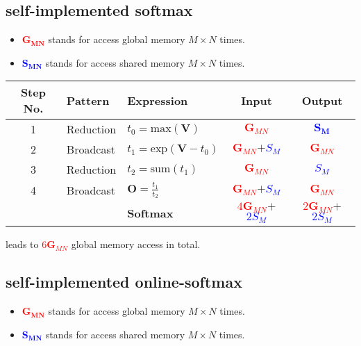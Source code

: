 \subsection{self-implemented softmax}

\begin{itemize}
    \item \textcolor{red}{$\mathbf{G_{MN}}$} stands for access global memory $M\times N$ times.
    \item \textcolor{blue}{$\mathbf{S_{MN}}$} stands for access shared memory $M\times N$ times.
\end{itemize}

\begin{tabular}{c|llcc}
    \toprule
    \textbf{Step No.}&\textbf{Pattern}&\textbf{Expression}&\textbf{Input}&\textbf{Output}\\\midrule
    1 & Reduction & $t_0 = \text{max}(\mathbf{V})$ &\textcolor{red}{$\mathbf{G}_{MN}$}&\textcolor{blue}{$\mathbf{S_M}$}\\
    2 & Broadcast & $t_1 = \text{exp}(\mathbf{V} - t_0)$&\textcolor{red}{$\mathbf{G}_{MN}$}$+$\textcolor{blue}{$S_M$}&\textcolor{red}{$\mathbf{G}_{MN}$}\\
    3 & Reduction & $t_2 = \text{sum}(t_1)$&\textcolor{red}{$\mathbf{G}_{MN}$}&\textcolor{blue}{$S_M$}\\
    4 & Broadcast & $\mathbf{O} = \frac{t_1}{t_2}$&\textcolor{red}{$\mathbf{G}_{MN}$}$+$\textcolor{blue}{$S_M$}&\textcolor{red}{$\mathbf{G}_{MN}$}\\\midrule
    &&\textbf{\textcolor{byzantium}{Softmax}}&\textcolor{red}{$4\mathbf{G}_{MN}$}$+$\textcolor{blue}{$2S_M$}&\textcolor{red}{$2\mathbf{G}_{MN}$}$+$\textcolor{blue}{$2S_M$}\\
    \bottomrule
\end{tabular}

leads to \textcolor{red}{$6\mathbf{G}_{MN}$} global memory access in total.

\subsection{self-implemented online-softmax}

\begin{itemize}
    \item \textcolor{red}{$\mathbf{G_{MN}}$} stands for access global memory $M\times N$ times.
    \item \textcolor{blue}{$\mathbf{S_{MN}}$} stands for access shared memory $M\times N$ times.
\end{itemize}

